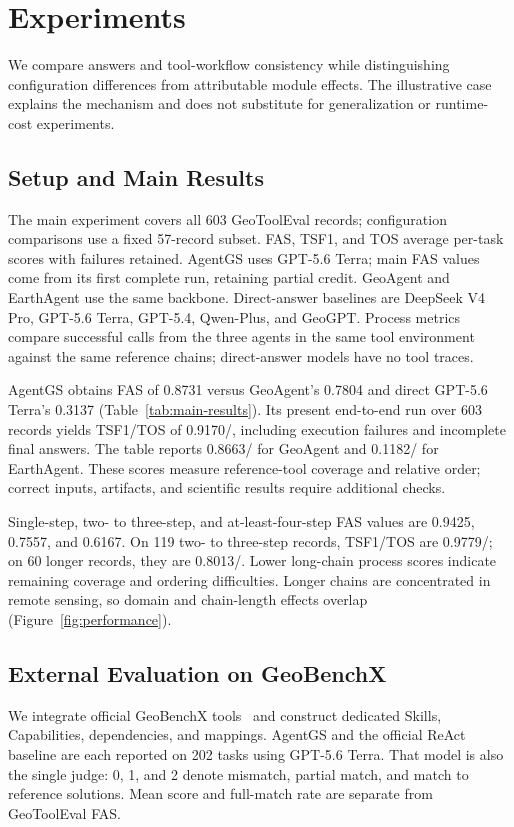 \section{Experiments}
\label{sec:experiments}
We compare answers and tool-workflow consistency while distinguishing configuration differences from attributable module effects. The illustrative case explains the mechanism and does not substitute for generalization or runtime-cost experiments.

\subsection{Setup and Main Results}
The main experiment covers all 603 GeoToolEval records; configuration comparisons use a fixed 57-record subset. FAS, TSF1, and TOS average per-task scores with failures retained. AgentGS uses GPT-5.6 Terra; main FAS values come from its first complete run, retaining partial credit. GeoAgent and EarthAgent use the same backbone. Direct-answer baselines are DeepSeek V4 Pro, GPT-5.6 Terra, GPT-5.4, Qwen-Plus, and GeoGPT. Process metrics compare successful calls from the three agents in the same tool environment against the same reference chains; direct-answer models have no tool traces.


AgentGS obtains FAS of 0.8731 versus GeoAgent's 0.7804 and direct GPT-5.6 Terra's 0.3137 (Table~\ref{tab:main-results}). Its present end-to-end run over 603 records yields TSF1/TOS of 0.9170/, including execution failures and incomplete final answers. The table reports 0.8663/ for GeoAgent and 0.1182/ for EarthAgent. These scores measure reference-tool coverage and relative order; correct inputs, artifacts, and scientific results require additional checks.

Single-step, two- to three-step, and at-least-four-step FAS values are 0.9425, 0.7557, and 0.6167. On 119 two- to three-step records, TSF1/TOS are 0.9779/; on 60 longer records, they are 0.8013/. Lower long-chain process scores indicate remaining coverage and ordering difficulties. Longer chains are concentrated in remote sensing, so domain and chain-length effects overlap (Figure~\ref{fig:performance}).


\subsection{External Evaluation on GeoBenchX}
\label{sec:external-evaluation}
We integrate official GeoBenchX tools~\cite{krechetova2025geobenchx} and construct dedicated Skills, Capabilities, dependencies, and mappings. AgentGS and the official ReAct baseline are each reported on 202 tasks using GPT-5.6 Terra. That model is also the single judge: 0, 1, and 2 denote mismatch, partial match, and match to reference solutions. Mean score and full-match rate are separate from GeoToolEval FAS.


